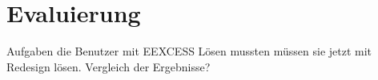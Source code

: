 \section{Evaluierung}
Aufgaben die Benutzer mit EEXCESS Lösen mussten müssen sie jetzt mit Redesign lösen. Vergleich der Ergebnisse?
